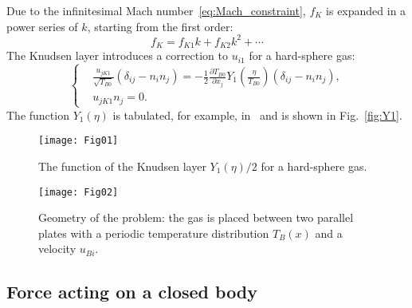 \documentclass[smallextended, final]{svjour3} %
\newcommand{\pder}[2][]{\frac{\partial#1}{\partial#2}}
\begin{document}
Due to the infinitesimal Mach number~\eqref{eq:Mach_constraint}, \(f_K\) is expanded
in a power series of \(k\), starting from the first order:
\[ f_K = f_{K1} k + f_{K2} k ^ 2 + \cdots \]
The Knudsen layer introduces a correction to \(u_{i1}\) for a hard-sphere gas:
\begin{equation}
    \left\{
    \begin{aligned}
        & \frac{u_{jK1}}{\sqrt{T_{B0}}}(\delta_{ij}-n_in_j) =
            -\frac12\pder[T_{B0}]{x_j} Y_1\left(\frac\eta{T_{B0}}\right) (\delta_{ij}-n_in_j), \\
        & u_{jK1}n_j = 0.
    \end{aligned}
    \right. \label{eq:bound:v_K}
\end{equation}
The function \(Y_1(\eta)\) is tabulated, for example, in~\cite{Sone2002, Sone2007} and is shown in Fig.~\ref{fig:Y1}.

\begin{figure}[ht]
    \centering
    \begin{minipage}{.48\textwidth}
        \centering
        \texttt{[image: Fig01]}
        \caption{The function of the Knudsen layer \(Y_1(\eta)/2\) for a hard-sphere gas.}
        \label{fig:Y1}
    \end{minipage}
    \quad
    \begin{minipage}{.48\textwidth}
        \centering
        \texttt{[image: Fig02]}
        \vspace{13pt}
        \caption{Geometry of the problem: the gas is placed between two parallel plates
            with a periodic temperature distribution \(T_B(x)\) and a velocity \(u_{Bi}\).}
        \label{fig:geometry}
    \end{minipage}
\end{figure}

\subsection{Force acting on a closed body}
\end{document}
